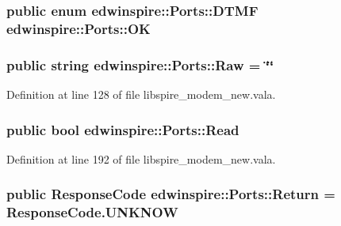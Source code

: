 \hypertarget{namespaceedwinspire_1_1Ports_a1191f3cc7d9551eb34e7132001a853e0}{
\subsubsection[{O\-K}]{\setlength{\rightskip}{0pt plus 5cm}public enum {\bf edwinspire\-::\-Ports\-::\-D\-T\-M\-F}
			 edwinspire\-::\-Ports\-::\-O\-K}}\label{namespaceedwinspire_1_1Ports_a1191f3cc7d9551eb34e7132001a853e0}
\hypertarget{namespaceedwinspire_1_1Ports_af811d776374cb560b42972cd1f1d4f61}{
\subsubsection[{Raw}]{\setlength{\rightskip}{0pt plus 5cm}public string edwinspire\-::\-Ports\-::\-Raw = \char`\"{}\char`\"{}}}\label{namespaceedwinspire_1_1Ports_af811d776374cb560b42972cd1f1d4f61}


Definition at line 128 of file libspire\-\_\-modem\-\_\-new.\-vala.

\hypertarget{namespaceedwinspire_1_1Ports_a5efed4bf03757ef2f2356e4d58bc0b25}{
\subsubsection[{Read}]{\setlength{\rightskip}{0pt plus 5cm}public bool edwinspire\-::\-Ports\-::\-Read}}\label{namespaceedwinspire_1_1Ports_a5efed4bf03757ef2f2356e4d58bc0b25}


Definition at line 192 of file libspire\-\_\-modem\-\_\-new.\-vala.

\hypertarget{namespaceedwinspire_1_1Ports_ab2f8774e65906dad0a298c764f0737df}{
\subsubsection[{Return}]{\setlength{\rightskip}{0pt plus 5cm}public Response\-Code edwinspire\-::\-Ports\-::\-Return = Response\-Code.\-U\-N\-K\-N\-O\-W}}\label{namespaceedwinspire_1_1Ports_ab2f8774e65906dad0a298c764f0737df}


